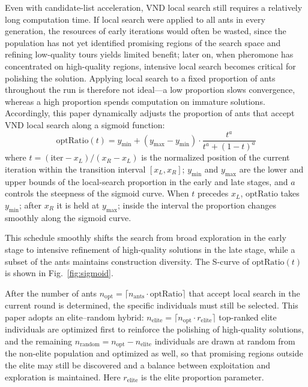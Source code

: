 \documentclass[lettersize,journal]{IEEEtran}
\begin{document}
Even with candidate-list acceleration, VND local search still requires a relatively long computation time. If local search were applied to all ants in every generation, the resources of early iterations would often be wasted, since the population has not yet identified promising regions of the search space and refining low-quality tours yields limited benefit; later on, when pheromone has concentrated on high-quality regions, intensive local search becomes critical for polishing the solution. Applying local search to a fixed proportion of ants throughout the run is therefore not ideal---a low proportion slows convergence, whereas a high proportion spends computation on immature solutions. Accordingly, this paper dynamically adjusts the proportion of ants that accept VND local search along a sigmoid function:
\begin{equation}
\mathrm{optRatio}(t) = y_{\min} + (y_{\max} - y_{\min}) \cdot \frac{t^{a}}{t^{a} + (1 - t)^{a}}
\label{eq:sigmoid}
\end{equation}
where $t = (\mathrm{iter} - x_L) / (x_R - x_L)$ is the normalized position of the current iteration within the transition interval $[x_L, x_R]$; $y_{\min}$ and $y_{\max}$ are the lower and upper bounds of the local-search proportion in the early and late stages, and $a$ controls the steepness of the sigmoid curve. When $t$ precedes $x_L$, $\mathrm{optRatio}$ takes $y_{\min}$; after $x_R$ it is held at $y_{\max}$; inside the interval the proportion changes smoothly along the sigmoid curve.

This schedule smoothly shifts the search from broad exploration in the early stage to intensive refinement of high-quality solutions in the late stage, while a subset of the ants maintains construction diversity. The S-curve of $\mathrm{optRatio}(t)$ is shown in Fig.~\textcolor{blue}{\ref{fig:sigmoid}}.

After the number of ants $n_{\mathrm{opt}} = \lceil n_{\mathrm{ants}} \cdot \mathrm{optRatio} \rceil$ that accept local search in the current round is determined, the specific individuals must still be selected. This paper adopts an elite--random hybrid: $n_{\mathrm{elite}} = \lceil n_{\mathrm{opt}} \cdot r_{\mathrm{elite}} \rceil$ top-ranked elite individuals are optimized first to reinforce the polishing of high-quality solutions, and the remaining $n_{\mathrm{random}} = n_{\mathrm{opt}} - n_{\mathrm{elite}}$ individuals are drawn at random from the non-elite population and optimized as well, so that promising regions outside the elite may still be discovered and a balance between exploitation and exploration is maintained. Here $r_{\mathrm{elite}}$ is the elite proportion parameter.
\end{document}

